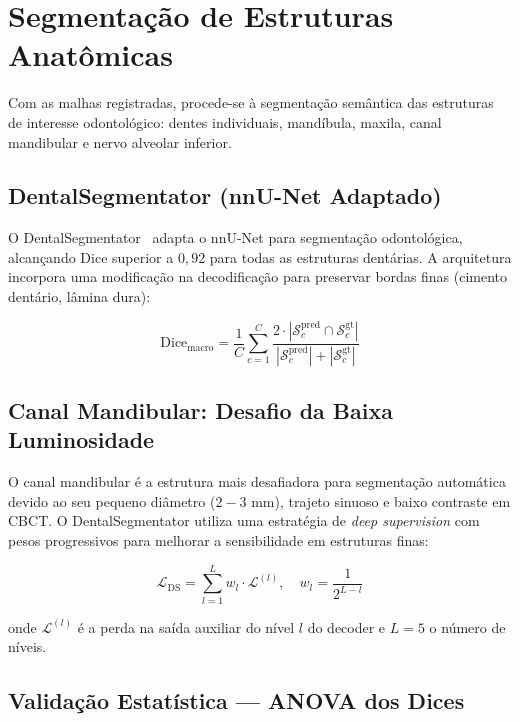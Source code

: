 \section{Segmentação de Estruturas Anatômicas}
\label{sec:segmentacao-estruturas}

Com as malhas registradas, procede-se à segmentação semântica das estruturas de interesse odontológico: dentes individuais, mandíbula, maxila, canal mandibular e nervo alveolar inferior.

\subsection{DentalSegmentator (nnU-Net Adaptado)}
\label{subsec:dental-segmentator}

O DentalSegmentator~\cite{sun2024dental} adapta o nnU-Net para segmentação odontológica, alcançando Dice superior a $0,92$ para todas as estruturas dentárias. A arquitetura incorpora uma modificação na decodificação para preservar bordas finas (cimento dentário, lâmina dura):

\begin{equation}
\label{eq:dice-dental}
\text{Dice}_{\text{macro}} = \frac{1}{C} \sum_{c=1}^{C} \frac{2 \cdot |\mathcal{S}_c^{\text{pred}} \cap \mathcal{S}_c^{\text{gt}}|}{|\mathcal{S}_c^{\text{pred}}| + |\mathcal{S}_c^{\text{gt}}|}
\end{equation}

\subsection{Canal Mandibular: Desafio da Baixa Luminosidade}
\label{subsec:canal-mandibular}

O canal mandibular é a estrutura mais desafiadora para segmentação automática devido ao seu pequeno diâmetro ($2-3$ mm), trajeto sinuoso e baixo contraste em CBCT. O DentalSegmentator utiliza uma estratégia de \textit{deep supervision} com pesos progressivos para melhorar a sensibilidade em estruturas finas:

\[
\mathcal{L}_{\text{DS}} = \sum_{l=1}^{L} w_l \cdot \mathcal{L}^{(l)}, \quad w_l = \frac{1}{2^{L-l}}
\]

onde $\mathcal{L}^{(l)}$ é a perda na saída auxiliar do nível $l$ do decoder e $L=5$ o número de níveis.

\subsection{Validação Estatística — ANOVA dos Dices}
\label{subsec:anova-dices}

